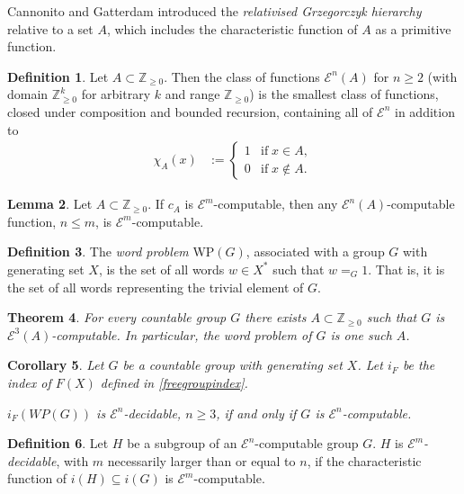\documentclass[a4paper]{article}
\newcommand{\grz}[1]{$\mathcal{E}^{#1}$}	%
\newcommand{\ZZ}{\mathbb{Z}}
\theoremstyle{plain}
\newtheorem{theorem}{Theorem}[section]
\newtheorem{corollary}[theorem]{Corollary}
\theoremstyle{definition}
\newtheorem{lemma}[theorem]{Lemma}
\newtheorem{definition}[theorem]{Definition}
\begin{document}
Cannonito and Gatterdam \cite{Cannonito_1973} introduced the {\it relativised Grzegorczyk hierarchy} relative to a set $A$, which includes the characteristic function of $A$ as a primitive function.

\begin{definition} \cite[Definition 2.3]{Cannonito_1973}
	Let $A \subset \ZZ_{\geq 0}$. Then the class of functions \grz{n}$(A)$ for $n \geq 2$ (with domain $\ZZ_{\geq 0}^k$ for arbitrary $k$ and range $\ZZ_{\geq 0}$) is the smallest class of functions, closed under composition and bounded recursion, containing all of \grz{n} in addition to 
	\begin{align}
		\chi_A(x) &:= \begin{cases}
									1 & \textrm{if}\; x \in A, \\
									0 & \textrm{if}\;  x \notin A.
							\end{cases}
	\end{align}
\end{definition}
\begin{lemma} \label{relativetonormalcomputable}
	Let $A \subset \ZZ_{\geq 0}$. If $c_A$ is \grz{m}-computable, then any \grz{n}$(A)$-computable function, $n \leq m$, is \grz{m}-computable.
\end{lemma}

\begin{definition}
	The {\it word problem} WP$(G)$, associated with a group $G$ with generating set $X$, is the set of all words $w \in X^{\ast}$ such that $w =_G 1$. That is, it is the set of all words representing the trivial element of $G$.
\end{definition}

\begin{theorem} \cite[Theorem 3.2]{Cannonito_1973} \label{wp-computable-implies-group}
	For every countable group $G$ there exists $A \subset \ZZ_{\geq 0}$ such that $G$ is \grz{3}$(A)$-computable. In particular, the word problem of $G$ is one such $A$.
\end{theorem}

\begin{corollary} \label{wp-iff-group}
	Let $G$ be a countable group with generating set $X$. Let $i_F$ be the index of $F(X)$ defined in \ref{freegroupindex}.
	
	$i_F(WP(G))$ is \grz{n}-decidable, $n \geq 3$, if and only if $G$ is \grz{n}-computable. 
\end{corollary}

\begin{definition}
	Let $H$ be a subgroup of an \grz{n}-computable group $G$. $H$ is {\it \grz{m}-decidable}, with $m$ necessarily larger than or equal to $n$, if the characteristic function of $i(H) \subseteq i(G)$ is \grz{m}-computable.
\end{definition}
\end{document}
